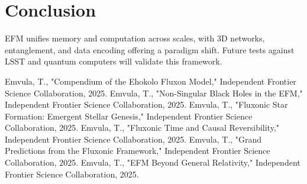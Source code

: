 \documentclass[11pt]{article}
\begin{document}
\section{Conclusion}
EFM unifies memory and computation across scales, with 3D networks, entanglement, and data encoding offering a paradigm shift. Future tests against LSST and quantum computers will validate this framework.




\begin{thebibliography}{9}
 Emvula, T., "Compendium of the Ehokolo Fluxon Model," Independent Frontier Science Collaboration, 2025.
 Emvula, T., "Non-Singular Black Holes in the EFM," Independent Frontier Science Collaboration, 2025.
 Emvula, T., "Fluxonic Star Formation: Emergent Stellar Genesis," Independent Frontier Science Collaboration, 2025.
 Emvula, T., "Fluxonic Time and Causal Reversibility," Independent Frontier Science Collaboration, 2025.
 Emvula, T., "Grand Predictions from the Fluxonic Framework," Independent Frontier Science Collaboration, 2025.
 Emvula, T., "EFM Beyond General Relativity," Independent Frontier Science Collaboration, 2025.
\end{thebibliography}
\end{document}

